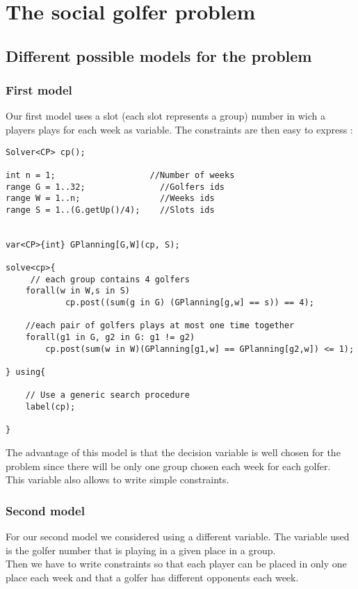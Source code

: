 \documentclass{eplDoc}
\begin{document}
\maketitle
\newpage

\section{The social golfer problem}

\subsection{Different possible models for the problem}
\subsubsection{First model}
Our first model uses a slot (each slot represents a group) number in wich a players plays for each week as variable. The constraints are then easy to express : 
\begin{lstlisting}
Solver<CP> cp();

int n = 1;                   //Number of weeks
range G = 1..32;               //Golfers ids
range W = 1..n;                //Weeks ids
range S = 1..(G.getUp()/4);    //Slots ids


var<CP>{int} GPlanning[G,W](cp, S);   

solve<cp>{
     // each group contains 4 golfers
    forall(w in W,s in S)
            cp.post((sum(g in G) (GPlanning[g,w] == s)) == 4);

    //each pair of golfers plays at most one time together
    forall(g1 in G, g2 in G: g1 != g2)
        cp.post(sum(w in W)(GPlanning[g1,w] == GPlanning[g2,w]) <= 1);

} using{

    // Use a generic search procedure
    label(cp);

}
\end{lstlisting}

The advantage of this model is that the decision variable is well chosen for the problem since there will be only one group chosen each week for each golfer. \\ 
This variable also allows to write simple constraints. \\ 

\subsubsection{Second model}
For our second model we considered using a different variable. The variable used is the golfer number that is playing in a given place in a group. \\ 
Then we have to write constraints so that each player can be placed in only one place each week and that a golfer has different opponents each week. 
\end{document}
